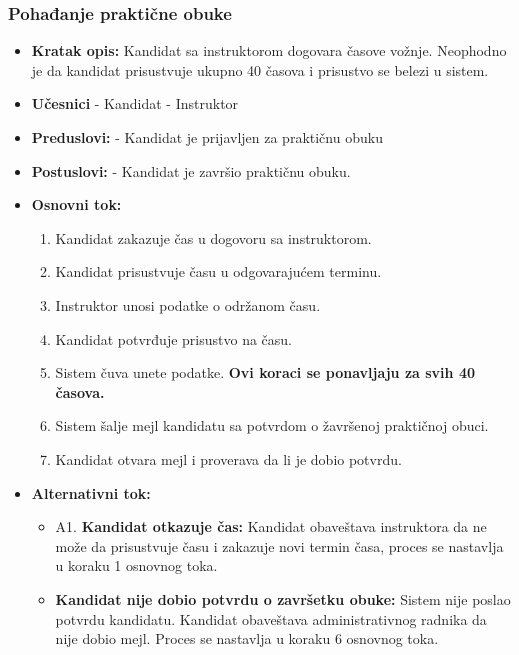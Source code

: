 \subsubsection{Pohađanje praktične obuke}

\vspace{3mm}

\begin{itemize}

\item \textbf{Kratak opis:} Kandidat sa instruktorom dogovara časove vožnje. Neophodno je da kandidat prisustvuje ukupno 40 časova i prisustvo se belezi u sistem.

\vspace{2mm}

\item \textbf{Učesnici} \newline
   - Kandidat \newline   
   - Instruktor 
   
\item \textbf{Preduslovi:} \newline
   - Kandidat je prijavljen za praktičnu obuku 

\item \textbf{Postuslovi:} \newline
    - Kandidat je završio praktičnu obuku.

\item \textbf{Osnovni tok:}  
   \begin{enumerate}
   \item Kandidat zakazuje čas u dogovoru sa instruktorom.
   \item Kandidat prisustvuje času u odgovarajućem terminu.
   \item Instruktor unosi podatke o održanom času.
   \item Kandidat potvrđuje prisustvo na času.
   \item Sistem čuva unete podatke. \newline
\textbf{Ovi koraci se ponavljaju za svih 40 časova.}
   \item Sistem šalje mejl kandidatu sa potvrdom o žavršenoj praktičnoj obuci.
   \item Kandidat otvara mejl i proverava da li je dobio potvrdu. 
   \end{enumerate}

\item \textbf{Alternativni tok:}  
   \begin{itemize}
   \item A1. \textbf{Kandidat otkazuje čas:}
  Kandidat obaveštava instruktora da ne može da prisustvuje času i zakazuje novi termin časa, proces se nastavlja u koraku 1 osnovnog toka.
  \item \textbf{Kandidat nije dobio potvrdu o završetku obuke:}
  Sistem nije poslao potvrdu kandidatu. Kandidat obaveštava administrativnog radnika da nije dobio mejl. Proces se nastavlja u koraku 6 osnovnog toka.
   \end{itemize}

\end{itemize}
